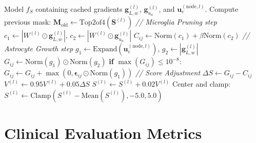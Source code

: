 \documentclass[11pt]{article}
\begin{document}
\begin{algorithm}[H]
\caption{Multi-Agent Score Update (\textsc{UpdateScoresAgents})}\label{alg:agents}
\begin{algorithmic}[1]
\Require Model $f_S$ containing cached gradients $\bm{g}_{L,w}^{(l)}$, $\bm{g}_{u_a}^{(l)}$, and $\bm{u}_e^{(\text{node}, l)}$.
    \State Compute previous mask: $\bm{M}_{\text{old}} \leftarrow \text{Top2of4}(\bm{S}^{(l)})$
    \State \textit{// Microglia Pruning step}
    \State $c_1 \leftarrow |W^{(l)} \odot \bm{g}_{L,w}^{(l)}|$, $c_2 \leftarrow |W^{(l)} \odot \bm{g}_{u_a}^{(l)}|$
    \State $C_{ij} \leftarrow \text{Norm}(c_1) + \beta \text{Norm}(c_2)$
    \State \textit{// Astrocyte Growth step}
    \State $g_1 \leftarrow \text{Expand}(\bm{u}_e^{(\text{node}, l)})$, $g_2 \leftarrow |\bm{g}_{L,w}^{(l)}|$
    \State $G_{ij} \leftarrow \text{Norm}(g_1) \odot \text{Norm}(g_2)$
    \State \textbf{if} $\max(G_{ij}) \le 10^{-8}$: $G_{ij} \leftarrow G_{ij} + \max(0, \bm{\epsilon}_{ij} \odot \text{Norm}(g_1))$
    \State \textit{// Score Adjustment}
    \State $\Delta S \leftarrow G_{ij} - C_{ij}$
    \State $V^{(l)} \leftarrow 0.95 V^{(l)} + 0.05 \Delta S$
    \State $S^{(l)} \leftarrow S^{(l)} + 0.02 V^{(l)}$
    \State Center and clamp: $S^{(l)} \leftarrow \text{Clamp}(S^{(l)} - \text{Mean}(S^{(l)}), -5.0, 5.0)$
\EndFor
\end{algorithmic}
\end{algorithm}

\section{Clinical Evaluation Metrics}\label{sec:eval}
\end{document}

